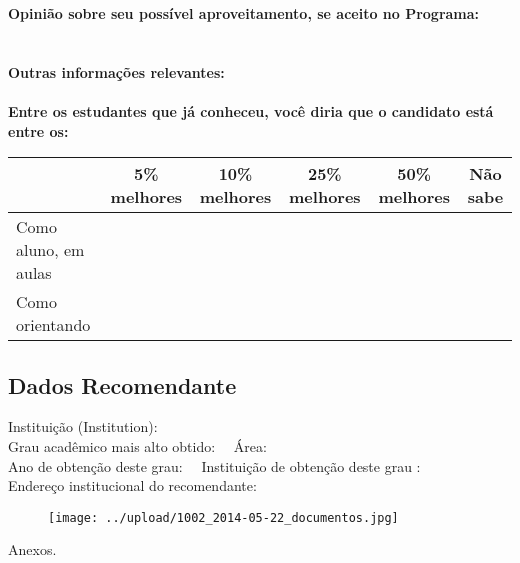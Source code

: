 \documentclass[11pt]{article}
\begin{document}
\textbf{Opinião sobre seu possível aproveitamento, se aceito no Programa:}
\\\\ 
\\
\textbf{Outras informações relevantes:} \\
\\[0.3cm]
\textbf{Entre os estudantes que já conheceu, você diria que o candidato está entre os:}
\\
\begin{tabular}{|l|c|c|c|c|c|}
\hline
 & 5\% melhores & 10\% melhores & 25\% melhores & 50\% melhores & Não sabe \\
\hline
Como aluno, em aulas &  &  &  &  & \\
\hline
Como orientando &  &  &  &  & \\
\hline
\end{tabular}
\subsection*{Dados Recomendante} 
	Instituição (Institution): 
\\ 
	Grau acadêmico mais alto obtido: 
	\ \ Área: 
	\\
	Ano de obtenção deste grau: 
	\ \ 
	Instituição de obtenção deste grau : 
	\\ 
	Endereço institucional do recomendante: \\ 	
\begin{figure}[!htb]
\texttt{[image: ../upload/1002\_2014-05-22\_documentos.jpg]}
\end{figure} 
\begin{center}
Anexos.
\end{center}
\end{document}
